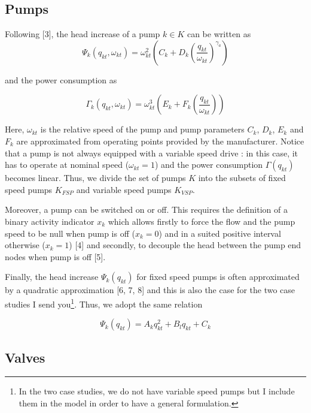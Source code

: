 \documentclass{article}
\begin{document}
\subsection{Pumps}

Following [3], the head increase of a pump $k \in K$ can be written as
\begin{equation}
\Psi_k(q_{kt},\omega_{kt}) = \omega_{kt}^{2}\left(C_k+D_k\left(\frac{q_{kt}}{\omega_{kt}}\right)^{\gamma_a}\right)
\end{equation}

and the power consumption as

\begin{equation}
\Gamma_k(q_{kt},\omega_{kt}) = \omega_{kt}^{3}\left(E_k+F_k\left(\frac{q_{kt}}{\omega_{kt}} \right ) \right )
\end{equation}

Here, $\omega_{kt}$ is the relative speed of the pump and pump parameters $C_k$, $D_k$, $E_k$
and $F_k$ are approximated from operating points provided by the manufacturer.
Notice that a pump is not always equipped with a variable speed
drive : in this case, it has to operate at nominal speed ($\omega_{kt} = 1$) and the power
consumption $\Gamma(q_{kt})$ becomes linear. Thus, we divide the set of pumps
$K$ into the subsets of fixed speed pumps $K_{FSP}$ and variable speed pumps
$K_{VSP}$.

Moreover, a pump can be switched on or off. This requires the definition
of a binary activity indicator $x_k$ which allows firstly to force the
flow and the
pump speed to be null when pump is off ($x_k = 0$) and in a suited positive
interval otherwise ($x_k = 1$) [4] and secondly, to decouple the head between
the pump end nodes when pump is off [5].

Finally, the head increase 	$\Psi_k(q_{kt})$ for fixed speed pumps is often approximated
by a quadratic approximation [6, 7, 8] and this is also the case for
the two case studies I send you\footnote{In the two case studies, we do not have variable speed pumps but I include them in
the model in order to have a general formulation.}. Thus, we adopt the same relation

\begin{equation}
\Psi_k(q_{kt}) = A_kq_{kt}^{2} + B_lq_{kt} + C_k
\end{equation}

\subsection{Valves}
\end{document}
